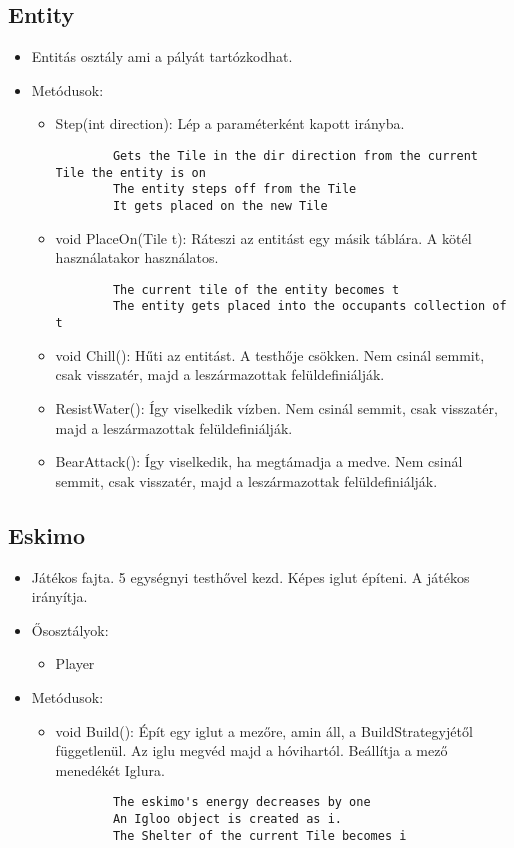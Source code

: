 \subsection{Entity}
\begin{itemize}
	\item Entitás osztály ami a pályát tartózkodhat.
	\item Metódusok:
	\begin{itemize}
		\item Step(int direction): Lép a paraméterként kapott irányba.
		\begin{lstlisting}
		Gets the Tile in the dir direction from the current Tile the entity is on
		The entity steps off from the Tile
		It gets placed on the new Tile
		\end{lstlisting}
		\item void PlaceOn(Tile t): Ráteszi az entitást egy másik táblára. A kötél használatakor használatos.
		\begin{lstlisting}
		The current tile of the entity becomes t
		The entity gets placed into the occupants collection of t
		\end{lstlisting}
		\item void Chill(): Hűti az entitást. A testhője csökken. Nem csinál semmit, csak visszatér, majd a leszármazottak felüldefiniálják.
		\item ResistWater(): Így viselkedik vízben. Nem csinál semmit, csak visszatér, majd a leszármazottak felüldefiniálják.
		\item BearAttack(): Így viselkedik, ha megtámadja a medve. Nem csinál semmit, csak visszatér, majd a leszármazottak felüldefiniálják.
	\end{itemize}
\end{itemize}

\subsection{Eskimo}
\begin{itemize}
	\item Játékos fajta. 5 egységnyi testhővel kezd. Képes iglut építeni. A játékos irányítja.
	\item Ősosztályok:
	\begin{itemize}
		\item Player
	\end{itemize}
	\item Metódusok:
	\begin{itemize}
		\item void Build(): Épít egy iglut a mezőre, amin áll, a BuildStrategyjétől függetlenül. Az iglu megvéd majd a hóvihartól. Beállítja a mező menedékét Iglura.
		\begin{lstlisting}
		The eskimo's energy decreases by one
		An Igloo object is created as i.
		The Shelter of the current Tile becomes i
		\end{lstlisting}
	\end{itemize}
\end{itemize}

